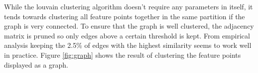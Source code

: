 \documentclass[conference]{IEEEtran}
\begin{document}
While the louvain clustering algorithm doesn't require any parameters in 
itself, it tends towards clustering all feature points together in the 
same partition if the graph is very connected.  To ensure that the graph 
is well clustered, the adjacency matrix is pruned so only edges above a 
certain threshold is kept. From empirical analysis keeping the 2.5\% of 
edges with the highest similarity seems to work well in practice. Figure 
\ref{fig:graph} shows the result of clustering the feature points 
displayed as a graph.
%
\begin{figure}
\end{figure}
\end{document}
